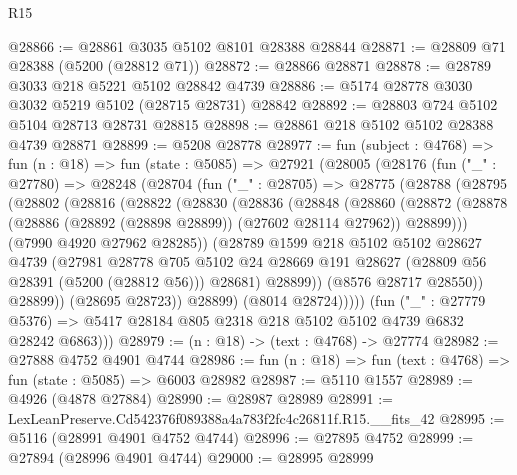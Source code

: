 \begin{lexlean}{R15}
\begin{coremodule}
{{{{{{{{{{{@28866 := @28861 @3035 @5102 @8101 @28388 @28844
@28871 := @28809 @71 @28388 (@5200 (@28812 @71))
@28872 := @28866 @28871
@28878 := @28789 @3033 @218 @5221 @5102 @28842 @4739
@28886 := @5174 @28778 @3030 @3032 @5219 @5102 (@28715 @28731) @28842
@28892 := @28803 @724 @5102 @5104 @28713 @28731 @28815
@28898 := @28861 @218 @5102 @5102 @28388 @4739 @28871
@28899 := @5208 @28778
@28977 := fun (subject : @4768) =>
  fun (n : @18) =>
  fun (state : @5085) =>
  @27921
    (@28005
      (@28176
        (fun ("_" : @27780) =>
        @28248
          (@28704
            (fun ("_" : @28705) =>
            @28775
              (@28788
                (@28795
                  (@28802
                    (@28816
                      (@28822
                        (@28830
                          (@28836
                            (@28848
                              (@28860
                                (@28872
                                  (@28878
                                    (@28886 (@28892 (@28898 @28899)) (@27602 @28114 @27962))
                                    @28899)))
                              (@7990 @4920 @27962 @28285))
                            (@28789
                              @1599
                              @218
                              @5102
                              @5102
                              @28627
                              @4739
                              (@27981
                                @28778
                                @705
                                @5102
                                @24
                                @28669
                                @191
                                @28627
                                (@28809 @56 @28391 (@5200 (@28812 @56)))
                                @28681)
                              @28899))
                          (@8576 @28717 @28550))
                        @28899))
                    (@28695 @28723))
                  @28899)
                (@8014 @28724)))))
        (fun ("_" : @27779 @5376) =>
        @5417 @28184 @805 @2318 @218 @5102 @5102 @4739 @6832 @28242 @6863)))
@28979 := (n : @18) -> (text : @4768) -> @27774
@28982 := @27888 @4752 @4901 @4744
@28986 := fun (n : @18) => fun (text : @4768) => fun (state : @5085) => @6003 @28982
@28987 := @5110 @1557
@28989 := @4926 (@4878 @27884)
@28990 := @28987 @28989
@28991 := LexLeanPreserve.Cd542376f089388a4a783f2fc4c26811f.R15.__fits_42
@28995 := @5116 (@28991 @4901 @4752 @4744)
@28996 := @27895 @4752
@28999 := @27894 (@28996 @4901 @4744)
@29000 := @28995 @28999
}}}}}}}}}}}
\end{coremodule}
\end{lexlean}
